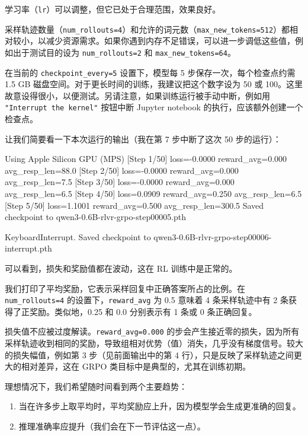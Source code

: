 学习率（\texttt{lr}）可以调整，但它已处于合理范围，效果良好。

采样轨迹数量（\texttt{num\_rollouts=4}）和允许的词元数（\texttt{max\_new\_tokens=512}）都相对较小，以减少资源需求。如果你遇到内存不足错误，可以进一步调低这些值，例如出于测试目的设为 \texttt{num\_rollouts=2} 和 \texttt{max\_new\_tokens=64}。

在当前的 \texttt{checkpoint\_every=5} 设置下，模型每 5 步保存一次，每个检查点约需 1.5 GB 磁盘空间。对于更长时间的训练，我建议把这个数字设为 50 或 100。这里故意设得很小，以便测试。另请注意，如果训练运行被手动中断，例如用 \texttt{"}\texttt{Interrupt the kernel}\texttt{"} 按钮中断 Jupyter notebook 的执行，应该额外创建一个检查点。

让我们简要看一下本次运行的输出（我在第 7 步中断了这次 50 步的运行）：

\begin{codebox}
Using Apple Silicon GPU (MPS)
[Step 1/50] loss=-0.0000 reward_avg=0.000 avg_resp_len=88.0
[Step 2/50] loss=-0.0000 reward_avg=0.000 avg_resp_len=7.5
[Step 3/50] loss=-0.0000 reward_avg=0.000 avg_resp_len=6.5
[Step 4/50] loss=0.0909 reward_avg=0.250 avg_resp_len=6.5
[Step 5/50] loss=1.1001 reward_avg=0.500 avg_resp_len=300.5
Saved checkpoint to qwen3-0.6B-rlvr-grpo-step00005.pth

KeyboardInterrupt. Saved checkpoint to qwen3-0.6B-rlvr-grpo-step00006-interrupt.pth
\end{codebox}

可以看到，损失和奖励值都在波动，这在 RL 训练中是正常的。

我们打印了平均奖励，它表示采样回复中正确答案所占的比例。在 \texttt{num\_rollouts=4} 的设置下，\texttt{reward\_avg} 为 0.5 意味着 4 条采样轨迹中有 2 条获得了正奖励。类似地，0.25 和 0.0 分别表示有 1 条或 0 条正确回复。

损失值不应被过度解读。\texttt{reward\_avg=0.000} 的步会产生接近零的损失，因为所有采样轨迹收到相同的奖励，导致组相对优势（值）消失，几乎没有梯度信号。较大的损失幅值，例如第 3 步（见前面输出中的第 4 行），只是反映了采样轨迹之间更大的相对差异，这在 GRPO 类目标中是典型的，尤其在训练初期。

理想情况下，我们希望随时间看到两个主要趋势：

\begin{enumerate}
\item 当在许多步上取平均时，平均奖励应上升，因为模型学会生成更准确的回复。
\item 推理准确率应提升（我们会在下一节评估这一点）。
\end{enumerate}

